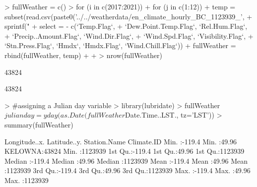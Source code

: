 \documentclass[11pt, a4paper]{article}
\begin{document}
\begin{Schunk}
\begin{Sinput}
> fullWeather = c()
> for (i in c(2017:2021)){
+   for (j in c(1:12)){
+     temp = subset(read.csv(paste0('../../weatherdata/en_climate_hourly_BC_1123939_', 
+       sprintf("%
+       select = - c(`Temp.Flag`, 
+       `Dew.Point.Temp.Flag`, `Rel.Hum.Flag`,
+       `Precip..Amount.Flag`, `Wind.Dir.Flag`, 
+       `Wind.Spd.Flag`, `Visibility.Flag`, 
+       `Stn.Press.Flag`, `Hmdx`, `Hmdx.Flag`, `Wind.Chill.Flag`))
+     fullWeather = rbind(fullWeather, temp)
+   }
+ }
> nrow(fullWeather)
\end{Sinput}
\begin{Soutput}
[1] 43824
\end{Soutput}
\begin{Soutput}
[1] 43824
\end{Soutput}
\begin{Sinput}
> #assigning a Julian day variable
> library(lubridate)
> fullWeather$julianday = yday(as.Date(fullWeather$Date.Time..LST., tz='LST'))
> summary(fullWeather)
\end{Sinput}
\begin{Soutput}
 Longitude..x.     Latitude..y.    Station.Name     Climate.ID     
 Min.   :-119.4   Min.   :49.96   KELOWNA:43824   Min.   :1123939  
 1st Qu.:-119.4   1st Qu.:49.96                   1st Qu.:1123939  
 Median :-119.4   Median :49.96                   Median :1123939  
 Mean   :-119.4   Mean   :49.96                   Mean   :1123939  
 3rd Qu.:-119.4   3rd Qu.:49.96                   3rd Qu.:1123939  
 Max.   :-119.4   Max.   :49.96                   Max.   :1123939  
                                                                   

\end{Soutput}
\end{Schunk}
\end{document}
